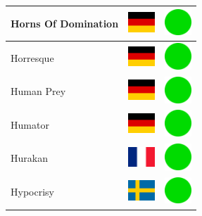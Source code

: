 \documentclass[12pt, a4paper, twoside]{report}
\begin{document}
\begin{center}
\begin{longtable}{|p{5cm}|p{2cm}|p{2cm}|}
			Horns Of Domination & \includegraphics[width=1cm]{4x3/de} & \includegraphics[width=1cm]{likes/y} \\ \hline
			Horresque & \includegraphics[width=1cm]{4x3/de} & \includegraphics[width=1cm]{likes/y} \\ \hline
			Human Prey & \includegraphics[width=1cm]{4x3/de} & \includegraphics[width=1cm]{likes/y} \\ \hline
			Humator & \includegraphics[width=1cm]{4x3/de} & \includegraphics[width=1cm]{likes/y} \\ \hline
			Hurakan & \includegraphics[width=1cm]{4x3/fr} & \includegraphics[width=1cm]{likes/y} \\ \hline
			Hypocrisy & \includegraphics[width=1cm]{4x3/se} & \includegraphics[width=1cm]{likes/y} \\ \hline

\end{longtable}
\end{center}
\end{document}
